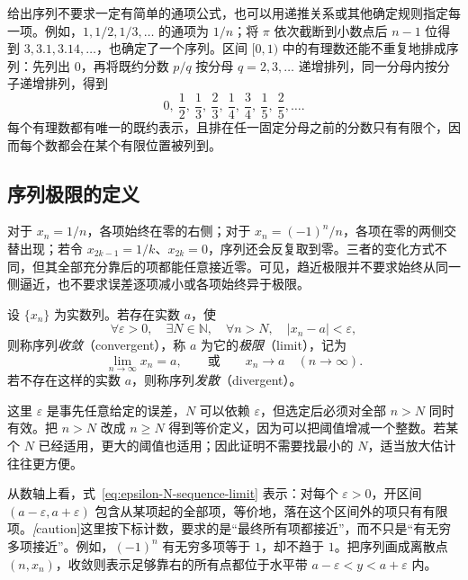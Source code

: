 \documentclass[UTF8,12pt,a4paper,fontset=fandol]{ctexbook}
\begin{document}
给出序列不要求一定有简单的通项公式，也可以用递推关系或其他确定规则指定每一项。例如，$1,1/2,1/3,\ldots$ 的通项为 $1/n$；将 $\pi$ 依次截断到小数点后 $n-1$ 位得到 $3,3.1,3.14,\ldots$，也确定了一个序列。区间 $[0,1)$ 中的有理数还能不重复地排成序列：先列出 $0$，再将既约分数 $p/q$ 按分母 $q=2,3,\ldots$ 递增排列，同一分母内按分子递增排列，得到
\[
    0,\ \frac12,\ \frac13,\ \frac23,\ \frac14,\ \frac34,\ \frac15,\ \frac25,\ldots.
\]
每个有理数都有唯一的既约表示，且排在任一固定分母之前的分数只有有限个，因而每个数都会在某个有限位置被列到。

\subsection{序列极限的定义}
\label{subsec:definition-of-sequence-limits}

对于 $x_n=1/n$，各项始终在零的右侧；对于 $x_n=(-1)^n/n$，各项在零的两侧交替出现；若令 $x_{2k-1}=1/k$、$x_{2k}=0$，序列还会反复取到零。三者的变化方式不同，但其全部充分靠后的项都能任意接近零。可见，趋近极限并不要求始终从同一侧逼近，也不要求误差逐项减小或各项始终异于极限。

\begin{definition}
\label{def:sequence-limit}
设 $\{x_n\}$ 为实数列。若存在实数 $a$，使
\begin{equation}
    \forall\varepsilon>0,\quad\exists N\in\mathbb{N},\quad
    \forall n>N,\quad |x_n-a|<\varepsilon,
    \label{eq:epsilon-N-sequence-limit}
\end{equation}
则称序列\emph{收敛}（convergent），称 $a$ 为它的\emph{极限}（limit），记为
\[
    \lim_{n\to\infty}x_n=a,
    \qquad\text{或}\qquad x_n\to a\quad(n\to\infty).
\]
若不存在这样的实数 $a$，则称序列\emph{发散}（divergent）。
\end{definition}

这里 $\varepsilon$ 是事先任意给定的误差，$N$ 可以依赖 $\varepsilon$，但选定后必须对全部 $n>N$ 同时有效。把 $n>N$ 改成 $n\geq N$ 得到等价定义，因为可以把阈值增减一个整数。若某个 $N$ 已经适用，更大的阈值也适用；因此证明不需要找最小的 $N$，适当放大估计往往更方便。

从数轴上看，式~\eqref{eq:epsilon-N-sequence-limit} 表示：对每个 $\varepsilon>0$，开区间 $(a-\varepsilon,a+\varepsilon)$ 包含从某项起的全部项，等价地，落在这个区间外的项只有有限项。\emph[caution]{这里按下标计数，要求的是“最终所有项都接近”，而不只是“有无穷多项接近”。}例如，$(-1)^n$ 有无穷多项等于 $1$，却不趋于 $1$。把序列画成离散点 $(n,x_n)$，收敛则表示足够靠右的所有点都位于水平带 $a-\varepsilon<y<a+\varepsilon$ 内。
\end{document}
